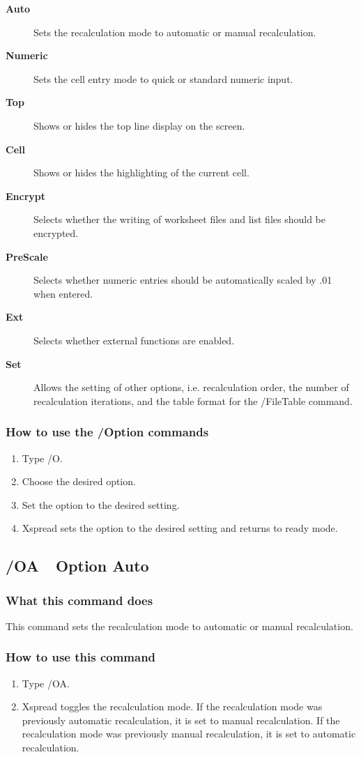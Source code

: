 \begin{description}
\item[{\bf Auto}]{Sets the recalculation mode to automatic or manual
        recalculation.}
\item[{\bf Numeric }]{Sets the cell entry mode to quick or standard numeric
input.}
\item[{\bf Top     }]{Shows or hides the top line display on the screen.}
\item[{\bf Cell    }]{Shows or hides the highlighting of the current cell.}
\item[{\bf Encrypt }]{Selects whether the writing of worksheet files and list
        files  should be encrypted.}
\item[{\bf PreScale }]{Selects whether numeric entries should be automatically
         scaled by .01 when entered.}
\item[{\bf Ext     }]{Selects whether external functions are enabled.}
\item[{\bf Set     }]{Allows the setting of other options, i.e. recalculation
        order,  the number of recalculation iterations, and the table format for the
        /FileTable command.}
\end{description}

\subsubsection*{How to use the /Option commands}
\begin{enumerate}
\item{Type /O.}
\item{Choose the desired option.}
\item{Set the option to the desired setting.}
\item{Xspread sets the option to the desired setting and returns to}
        ready mode.
\end{enumerate}
        
\subsection*{/OA\ \      Option Auto}

\subsubsection*{What this command does}
This command sets the recalculation mode to automatic or manual 
recalculation.

\subsubsection*{How to use this command}
\begin{enumerate}
\item{Type /OA.}
\item{Xspread toggles the recalculation mode.  If the recalculation mode
        was previously automatic recalculation, it is set to manual
        recalculation.  If the recalculation mode was previously manual
        recalculation, it is set to automatic recalculation.}
\end{enumerate}

